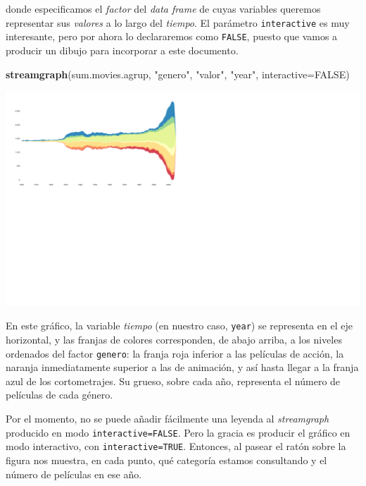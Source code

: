 \documentclass[
]{book}
\newenvironment{Shaded}{\begin{snugshade}}{\end{snugshade}}
\newcommand{\DataTypeTok}[1]{\textcolor[rgb]{0.13,0.29,0.53}{#1}}
\newcommand{\KeywordTok}[1]{\textcolor[rgb]{0.13,0.29,0.53}{\textbf{#1}}}
\newcommand{\NormalTok}[1]{#1}
\newcommand{\OtherTok}[1]{\textcolor[rgb]{0.56,0.35,0.01}{#1}}
\newcommand{\StringTok}[1]{\textcolor[rgb]{0.31,0.60,0.02}{#1}}
\theoremstyle{definition}
\theoremstyle{definition}
\theoremstyle{definition}
\theoremstyle{remark}
\begin{document}
donde especificamos el \emph{factor} del \emph{data frame} de cuyas variables queremos representar sus \emph{valores} a lo largo del \emph{tiempo}. El parámetro \texttt{interactive} es muy interesante, pero por ahora lo declararemos como \texttt{FALSE}, puesto que vamos a producir un dibujo para incorporar a este documento.

\begin{Shaded}
\begin{Highlighting}[]
\KeywordTok{streamgraph}\NormalTok{(sum.movies.agrup, }\StringTok{"genero"}\NormalTok{, }\StringTok{"valor"}\NormalTok{, }\StringTok{"year"}\NormalTok{,}
   \DataTypeTok{interactive=}\OtherTok{FALSE}\NormalTok{)}
\end{Highlighting}
\end{Shaded}

\begin{center}\includegraphics[width=0.9\linewidth]{14cap13_EDextra_files/figure-latex/unnamed-chunk-46-1} \end{center}

En este gráfico, la variable \emph{tiempo} (en nuestro caso, \texttt{year}) se representa en el eje horizontal, y las franjas de colores corresponden, de abajo arriba, a los niveles ordenados del factor \texttt{genero}: la franja roja inferior a las películas de acción, la naranja inmediatamente superior a las de animación, y así hasta llegar a la franja azul de los cortometrajes. Su grueso, sobre cada año, representa el número de películas de cada género.

Por el momento, no se puede añadir fácilmente una leyenda al \emph{streamgraph} producido en modo \texttt{interactive=FALSE}. Pero la gracia es producir el gráfico en modo interactivo, con \texttt{interactive=TRUE}. Entonces, al pasear el ratón sobre la figura nos muestra, en cada punto, qué categoría estamos consultando y el número de películas en ese año.
\end{document}
